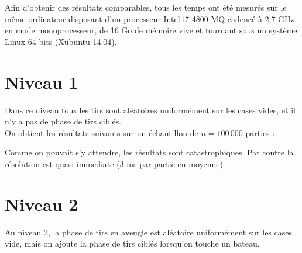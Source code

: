 Afin d'obtenir des résultats comparables, tous les temps ont été mesurés sur le même ordinateur disposant d'un processeur Intel i7-4800-MQ cadencé à 2,7 GHz en mode monoprocesseur, de 16 Go de mémoire vive et tournant sous un système Linux 64 bits (Xubuntu 14.04).

\newpage
\section{Niveau 1}
Dans ce niveau tous les tirs sont aléatoires uniformément sur les cases vides, et il n'y a pas de phase de tirs ciblés.\\
On obtient les résultats suivants sur un échantillon de $n=100\,000$ parties :

\begin{center}
\end{center}

Comme on pouvait s'y attendre, les résultats sont catastrophiques. Par contre la résolution est quasi immédiate (3 ms par partie en moyenne)
\newpage
\section{Niveau 2}
Au niveau 2, la phase de tirs en aveugle est aléatoire uniformément sur les cases vide, mais on ajoute la phase de tirs ciblés lorsqu'on touche un bateau.

